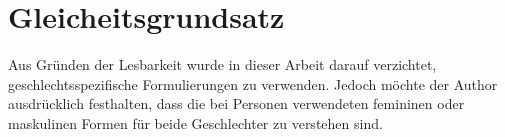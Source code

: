 
\chapter*{Gleicheitsgrundsatz}
Aus Gründen der Lesbarkeit wurde in dieser Arbeit darauf verzichtet, geschlechtsspezifische Formulierungen zu verwenden. Jedoch möchte der Author ausdrücklich
festhalten, dass die bei Personen verwendeten femininen oder maskulinen Formen für beide Geschlechter zu verstehen sind.
